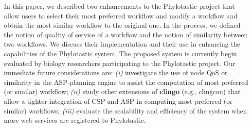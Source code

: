 \documentclass{new_tlp}
\begin{document}
In this paper, we described two enhancements to the Phylotastic project 
that allow users to select their most preferred workflow and modify a
workflow and obtain the most similar workflow to the original one. 
In the process, we defined the notion of quality of service of a workflow 
and the notion of similarity between two workflows. We discuss their 
implementation and their use in enhancing the capabilities of the Phylotastic system. 
The proposed system is currently begin evaluated by biology researchers participating to the Phylotastic 
project. Our immediate future considerations are: {\em (i)} investigate the use of node QoS or similarity
in the ASP-planning engine to assist the computation of most preferred (or similar) workflow;
{\em (ii)} study other extensions of {\bf clingo} (e.g., clingcon) that allow a tighter integration of 
CSP and ASP in computing most preferred (or similar) workflows; 
{\em (iii)} evaluate the scalability and efficiency of the system when more web services are 
registered to Phylotastic. 
 





\label{lastpage}
\end{document}
